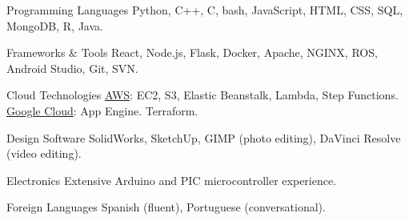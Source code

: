 
\begin{cvskills}
  \cvskill
    {Programming Languages} %
    {Python, C++, C, bash, JavaScript, HTML, CSS, SQL, MongoDB, R, Java.} %

  \cvskill
    {Frameworks \& Tools} %
    {React, Node.js, Flask, Docker, Apache, NGINX, ROS, Android Studio, Git, SVN.} %

  \cvskill
    {Cloud Technologies} %
    {\underline{AWS}: EC2, S3, Elastic Beanstalk, Lambda, Step Functions. \underline{Google Cloud}: App Engine.  Terraform.} %

  \cvskill
    {Design Software}
    {SolidWorks, SketchUp, GIMP (photo editing), DaVinci Resolve (video editing).}

  \cvskill
    {Electronics}
    {Extensive Arduino and PIC microcontroller experience.}

  \cvskill
    {Foreign Languages}
    {Spanish (fluent), Portuguese (conversational).}

\end{cvskills}
